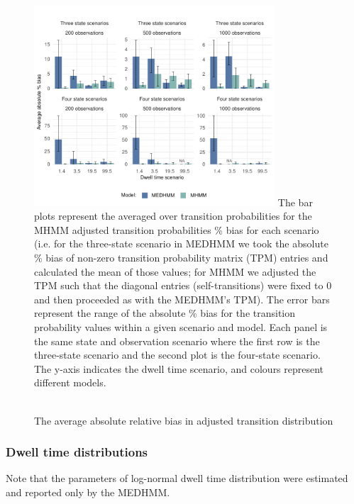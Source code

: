 \begin{figure}[h]
\caption{\\The average absolute relative bias in adjusted transition distribution}
    \centering
    \includegraphics[width=0.8\textwidth]{graphics/transition_prob_biasv2.pdf}
    \flushleft
\footnotesize
\justifying
The bar plots represent the averaged over transition probabilities for the MHMM adjusted transition probabilities \% bias for each scenario (i.e. for the three-state scenario in MEDHMM we took the absolute \% bias of non-zero transition probability matrix (TPM) entries and calculated the mean of those values; for MHMM we adjusted the TPM such that the diagonal entries (self-transitions) were fixed to 0 and then proceeded as with the MEDHMM's TPM). The error bars represent the range of the absolute \% bias for the transition probability values within a given scenario and model. Each panel is the same state and observation scenario where the first row is the three-state scenario and the second plot is the four-state scenario. The y-axis indicates the dwell time scenario, and colours represent different models. 
    \label{trans_bias}
\end{figure}


\subsubsection{Dwell time distributions}
Note that the parameters of log-normal dwell time distribution were estimated and reported only by the MEDHMM. 

